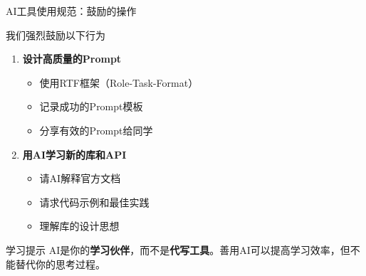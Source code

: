 \begin{frame}{AI工具使用规范：鼓励的操作}
	\begin{exampleblock}{我们强烈鼓励以下行为}
		\begin{enumerate}
			\item \textbf{设计高质量的Prompt}
			\begin{itemize}
				\item 使用RTF框架（Role-Task-Format）
				\item 记录成功的Prompt模板
				\item 分享有效的Prompt给同学
			\end{itemize}

			\item \textbf{用AI学习新的库和API}
			\begin{itemize}
				\item 请AI解释官方文档
				\item 请求代码示例和最佳实践
				\item 理解库的设计思想
			\end{itemize}
		\end{enumerate}
	\end{exampleblock}

	\vspace{0.3cm}

	\begin{block}{学习提示}
		AI是你的\textbf{学习伙伴}，而不是\textbf{代写工具}。善用AI可以提高学习效率，但不能替代你的思考过程。
	\end{block}
\end{frame}

